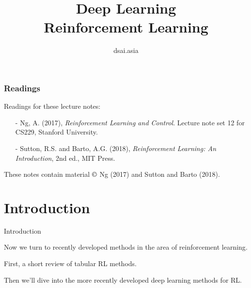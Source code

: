 \documentclass{beamer}
\title[Deep Learning]{Deep Learning\\Reinforcement Learning}
\author{dsai.asia}
\institute[]{
  Asian Data Science and Artificial Intelligence Master's Program}
\date{}
\begin{document}


\frame{\titlepage}

%

\begin{frame}
\frametitle{Readings}

Readings for these lecture notes:
\begin{itemize}
\item[-] Ng, A. (2017), \textit{Reinforcement Learning and Control}.
  Lecture note set 12 for CS229, Stanford University.
\item[-] Sutton, R.S. and Barto, A.G. (2018), \textit{Reinforcement
  Learning: An Introduction}, 2nd ed., MIT Press.
\end{itemize}

These notes contain material $\copyright$ Ng (2017) and Sutton and
Barto (2018).

\end{frame}

\section{Introduction}

\begin{frame}{Introduction}

  Now we turn to recently developed methods in the area
  of \alert{reinforcement learning}.

  \medskip

  First, a short review of tabular RL methods.

  \medskip

  Then we'll dive into the more recently developed deep learning
  methods for RL.

\end{frame}
\end{document}
